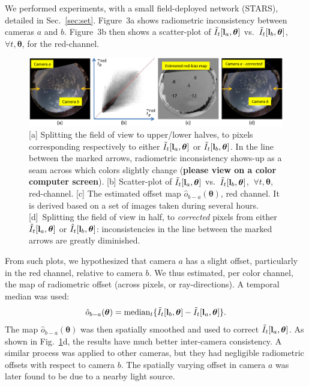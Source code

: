 \documentclass[runningheads]{llncs}
\begin{document}
We performed experiments, with a small field-deployed network (STARS), detailed in Sec.~\ref{sec:set}. Figure~3a shows radiometric inconsistency between cameras $a$ and $b$. Figure~3b then shows a scatter-plot of
$\tilde I_t[{\bf l}_a,{\bm \theta}]$ vs.~$\tilde I_t[{\bf l}_{b},{\bm \theta}]$, $\forall t,{\bm \theta}$, for the red-channel.
\begin{figure}[t!]
\begin{center}
   \includegraphics[width=\linewidth]{bias4.eps}
\end{center}
   \vspace{-0.6cm}
   \caption{[a] Splitting the field of view to upper/lower halves, to pixels corresponding
   respectively to either $\tilde I_t[{\bf l}_a,{\bm \theta}]$  or $\tilde I_t[{\bf l}_{b},{\bm \theta}]$. In the line between the marked arrows, radiometric inconsistency shows-up as a seam across which colors slightly change ({\bf please view on a color computer screen}). [b] Scatter-plot of
   $\tilde I_t[{\bf l}_a,{\bm \theta}]$ vs.~$\tilde I_t[{\bf l}_{b},{\bm \theta}]$, $~\forall t,{\bm \theta}$, red-channel. [c] The estimated offset map ${\hat o}_{b-a}({\bm \theta})$, red channel. It is derived based on a set of images taken during several hours.
   [d]~Splitting the field of view in half, to {\em corrected} pixels from either
   $\hat I_t[{\bf l}_a,{\bm \theta}]$  or $\hat I_t[{\bf l}_{b},{\bm \theta}]$: inconsistencies in the line between the marked arrows are greatly
   diminished.
   }
\label{fig:calibration}
\end{figure}
From such plots, we hypothesized that camera $a$ has a slight offset, particularly in the red channel, relative to camera $b$. We thus estimated, per color channel, the map of radiometric offset (across pixels, or ray-directions). A temporal median was used:
\begin{equation}
 {\hat o}_{b-a}({\bm \theta})=
  {\rm median}_{t} \{\tilde I_t[{\bf l}_b,{\bm \theta}]-\tilde I_t[{\bf l}_a,{\bm \theta}]\}.
 \label{eq:hato}
\end{equation}
The map ${\hat o}_{b-a}({\bm \theta})$ was then spatially smoothed and used to correct $\tilde I_t[{\bf l}_a,{\bm \theta}]$. As shown in Fig.~\ref{fig:calibration}d, the results have much better inter-camera consistency. A similar process was applied to other cameras, but they had negligible radiometric offsets with respect to camera $b$. The spatially varying offset in camera $a$ was later found to be due to a nearby light source.
\end{document}
